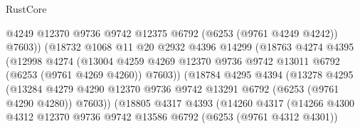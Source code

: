 \begin{lexlean}{RustCore}
\begin{coremodule}
                                  @4249
                                  @12370
                                  @9736
                                  @9742
                                  @12375
                                  @6792
                                  (@6253 (@9761 @4249 @4242))
                                  @7603))
                              (@18732
                                @1068
                                @11
                                @20
                                @2932
                                @4396
                                @14299
                                (@18763
                                  @4274
                                  @4395
                                  (@12998
                                    @4274
                                    (@13004
                                      @4259
                                      @4269
                                      @12370
                                      @9736
                                      @9742
                                      @13011
                                      @6792
                                      (@6253 (@9761 @4269 @4260))
                                      @7603))
                                  (@18784
                                    @4295
                                    @4394
                                    (@13278
                                      @4295
                                      (@13284
                                        @4279
                                        @4290
                                        @12370
                                        @9736
                                        @9742
                                        @13291
                                        @6792
                                        (@6253 (@9761 @4290 @4280))
                                        @7603))
                                    (@18805
                                      @4317
                                      @4393
                                      (@14260
                                        @4317
                                        (@14266
                                          @4300
                                          @4312
                                          @12370
                                          @9736
                                          @9742
                                          @13586
                                          @6792
                                          (@6253 (@9761 @4312 @4301))

\end{coremodule}
\end{lexlean}
